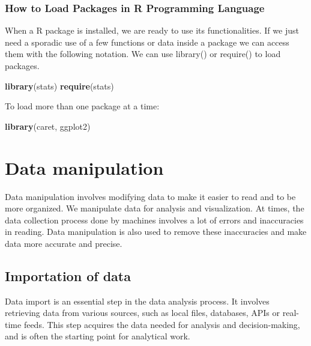 \documentclass[
]{book}
\newenvironment{Shaded}{\begin{snugshade}}{\end{snugshade}}
\newcommand{\FunctionTok}[1]{\textcolor[rgb]{0.13,0.29,0.53}{\textbf{#1}}}
\newcommand{\NormalTok}[1]{#1}
\begin{document}
\hypertarget{how-to-load-packages-in-r-programming-language}{%
\subsection*{How to Load Packages in R Programming Language}\label{how-to-load-packages-in-r-programming-language}}

When a R package is installed, we are ready to use its functionalities. If we just need a sporadic use of a few functions or data inside a package we can access them with the following notation.
We can use library() or require() to load packages.

\begin{Shaded}
\begin{Highlighting}[]
\FunctionTok{library}\NormalTok{(stats)}
\FunctionTok{require}\NormalTok{(stats)}
\end{Highlighting}
\end{Shaded}

To load more than one package at a time:

\begin{Shaded}
\begin{Highlighting}[]
\FunctionTok{library}\NormalTok{(caret, ggplot2)}
\end{Highlighting}
\end{Shaded}

\hypertarget{data-manipulation}{%
\chapter{Data manipulation}\label{data-manipulation}}

Data manipulation involves modifying data to make it easier to read and to be more organized. We manipulate data for analysis and visualization. At times, the data collection process done by machines involves a lot of errors and inaccuracies in reading. Data manipulation is also used to remove these inaccuracies and make data more accurate and precise.

\hypertarget{importation-of-data}{%
\section{Importation of data}\label{importation-of-data}}

Data import is an essential step in the data analysis process. It involves retrieving data from various sources, such as local files, databases, APIs or real-time feeds. This step acquires the data needed for analysis and decision-making, and is often the starting point for analytical work.
\end{document}
